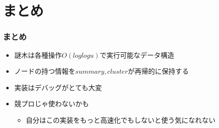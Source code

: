 \documentclass[dvipdfmx,12pt,notheorems]{beamer}
\theoremstyle{definition}
\begin{document}
\section{まとめ}
\begin{frame}\frametitle{まとめ}
\begin{itemize}
\item 謎木は各種操作$O(loglogu)$で実行可能なデータ構造
\item ノードの持つ情報を$summary,cluster$が再帰的に保持する
\item 実装はデバッグがとても大変
\item \alert{競プロじゃ使わないかも}
\begin{itemize}\item 自分はこの実装をもっと高速化でもしないと使う気になれない \end{itemize}
\end{itemize}
\end{frame}
\end{document}
